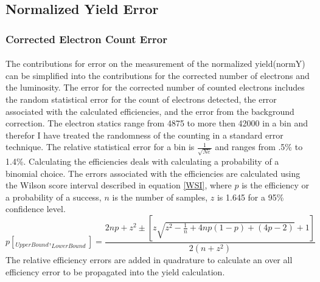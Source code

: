 \subsection{Normalized Yield Error}
\subsubsection{Corrected Electron Count Error}
\paragraph{}
The contributions for error on the measurement of the normalized yield(normY) can be simplified into the contributions for the corrected number of electrons and the luminosity. The error for the corrected number of counted electrons includes the random statistical error for the count of electrons detected, the error associated with the calculated efficiencies, and the error from the background correction. The electron statics range from 4875 to more then 42000 in a bin and therefor I have treated the randomness of the counting in a standard error technique. The relative statistical error for a bin is $\frac{1}{\sqrt{Ne}}$ and ranges from .5\% to 1.4\%. Calculating the efficiencies deals with calculating a probability of a binomial choice. The errors associated with the efficiencies are calculated using the Wilson score interval described in equation \ref{WSI}, where $p$ is the efficiency or a probability of a success, $n$ is the number of samples, $z$ is 1.645 for a 95\% confidence level. 
\begin{equation}
p[_{UpperBound},_{LowerBound}] = \frac{ 2np +z^2 \pm \left[z\sqrt{z^2 - \frac{1}{n} + 4np(1-p) +(4p-2)} + 1 \right]}{2(n+z^2)} \label{WSI}
\end{equation}
The relative efficiency errors are added in quadrature to calculate an over all efficiency error to be propagated into the yield calculation.
